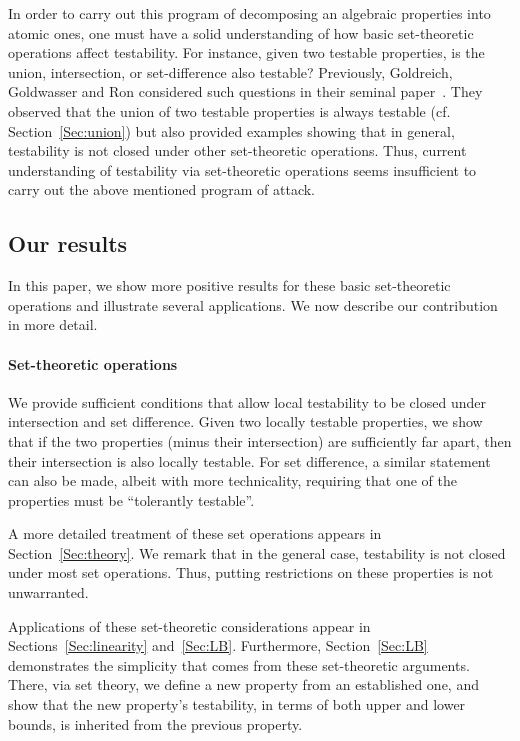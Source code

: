 \documentclass[11pt,english]{article}
\theoremstyle{definition}
\theoremstyle{remark}
\begin{document}
In order to carry out this program of decomposing an algebraic properties into atomic ones, 
one must have a solid understanding of how basic set-theoretic operations affect testability. 
For instance, given two testable properties, is the union, intersection, 
or set-difference also testable? 
Previously, Goldreich, Goldwasser and Ron 
considered such questions in their seminal paper~\cite{GGR98}. 
They observed that the union of two testable properties 
is always testable (cf. Section~\ref{Sec:union}) but
also provided examples showing that in general, testability is not
closed under other set-theoretic operations. 
Thus, current understanding of testability via set-theoretic operations 
seems insufficient to carry out the above mentioned program of attack. 

\subsection{Our results}

In this paper, we show more positive results for these basic set-theoretic
operations and illustrate several applications. We now describe our
contribution in more detail.

\paragraph{Set-theoretic operations}

We provide sufficient conditions that allow local testability to be closed
under intersection and set difference. Given two locally testable properties,
we show that if the two properties (minus their intersection) are
sufficiently far apart, then their intersection is also locally testable.
For set difference, a similar statement can also be made, albeit with
more technicality, requiring that one of the properties must be   ``tolerantly
testable''. 

A more detailed treatment of these set operations appears in Section~\ref{Sec:theory}.
We remark that in the general case, testability is not closed under
most set operations. Thus, putting restrictions on these properties
is not unwarranted. 

Applications of these set-theoretic considerations appear in Sections~\ref{Sec:linearity}
and~\ref{Sec:LB}. Furthermore, Section~\ref{Sec:LB} demonstrates
the simplicity that comes from these set-theoretic arguments. 
There, via set theory, we define a new property from an established one, and show that 
the new property's testability, in terms of both upper and lower bounds, is
inherited from the previous property. 
\end{document}
